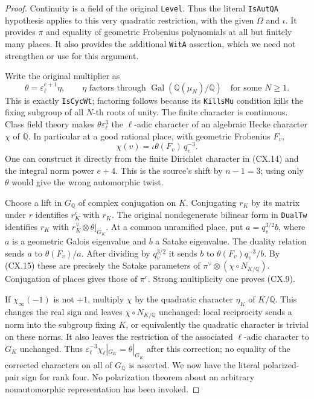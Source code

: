 \begin{proof}
Continuity is a field of the original \texttt{Level}.  Thus
the literal \texttt{IsAutQA} hypothesis applies to this very
quadratic restriction, with the given $\Omega$ and $\iota$.
It provides $\pi$ and equality of geometric Frobenius
polynomials at all but finitely many places.  It also provides
the additional \texttt{WitA} assertion, which we need not
strengthen or use for this argument.

Write the original multiplier as
\[
 \theta=\varepsilon_\ell^{e+1}\eta,
 \qquad \eta\text{ factors through }
       \operatorname{Gal}(\mathbb Q(\mu_N)/\mathbb Q)
 \quad\text{for some }N\ge1.                                 \tag{CX.14}
\]
This is exactly \texttt{IsCycWt}; factoring follows because its
\texttt{KillsMu} condition kills the fixing subgroup of all
$N$-th roots of unity.  The finite character is continuous.
Class field theory makes
$\theta\varepsilon_\ell^3$ the $\ell$-adic character of an
algebraic Hecke character $\chi$ of $\mathbb Q$.  In particular
at a good rational place, with geometric Frobenius $F_v$,
\[
             \chi(v)=\iota\theta(F_v)\,q_v^{-3}.
                                                               \tag{CX.15}
\]
One can construct it directly from the finite Dirichlet
character in (CX.14) and the integral norm power $e+4$.
This is the source's shift by $n-1=3$; using only $\theta$
would give the wrong automorphic twist.

Choose a lift in $G_{\mathbb Q}$ of complex conjugation on
$K$.  Conjugating $r_K$ by its matrix under $r$ identifies
$r_K^c$ with $r_K$.  The original nondegenerate bilinear
form in \texttt{DualTw} identifies $r_K$ with
$r_K^\vee\otimes\theta|_{G_K}$.  At a common unramified
place, put $a=q_v^{3/2}b$, where $a$ is a geometric Galois
eigenvalue and $b$ a Satake eigenvalue.  The duality relation
sends $a$ to $\theta(F_v)/a$.  After dividing by $q_v^{3/2}$
it sends $b$ to $\theta(F_v)q_v^{-3}/b$.  By (CX.15) these
are precisely the Satake parameters of
$\pi^\vee\otimes(\chi\circ N_{K/\mathbb Q})$.
Conjugation of places gives those of $\pi^c$.
Strong multiplicity one proves (CX.9).

If $\chi_\infty(-1)$ is not $+1$, multiply $\chi$ by the
quadratic character $\eta_K$ of $K/\mathbb Q$.
This changes the real sign and leaves
$\chi\circ N_{K/\mathbb Q}$ unchanged: local reciprocity
sends a norm into the subgroup fixing $K$, or equivalently the
quadratic character is trivial on these norms.  It also leaves
the restriction of the associated $\ell$-adic character to
$G_K$ unchanged.  Thus
$\varepsilon_\ell^{-3}\chi_\ell|_{G_K}=\theta|_{G_K}$
after this correction; no equality of the corrected characters
on all of $G_{\mathbb Q}$ is asserted.  We now have the literal polarized-pair sign
for rank four.  No polarization theorem about an arbitrary
nonautomorphic representation has been invoked.


\end{proof}
